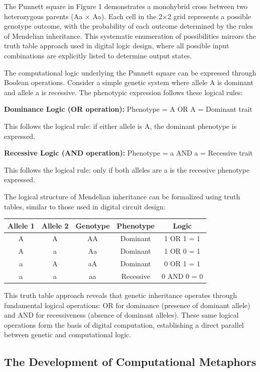 \documentclass[11pt]{article}
\begin{document}
The Punnett square in Figure 1 demonstrates a monohybrid cross between two heterozygous parents (Aa × Aa). Each cell in the 2×2 grid represents a possible genotype outcome, with the probability of each outcome determined by the rules of Mendelian inheritance. This systematic enumeration of possibilities mirrors the truth table approach used in digital logic design, where all possible input combinations are explicitly listed to determine output states.

The computational logic underlying the Punnett square can be expressed through Boolean operations. Consider a simple genetic system where allele A is dominant and allele a is recessive. The phenotypic expression follows these logical rules:

\textbf{Dominance Logic (OR operation):} Phenotype = A OR A = Dominant trait

This follows the logical rule: if either allele is A, the dominant phenotype is expressed.

\textbf{Recessive Logic (AND operation):} Phenotype = a AND a = Recessive trait

This follows the logical rule: only if both alleles are a is the recessive phenotype expressed.

The logical structure of Mendelian inheritance can be formalized using truth tables, similar to those used in digital circuit design:

\begin{center}
\begin{tabular}{|c|c|c|c|c|}
\hline
Allele 1 & Allele 2 & Genotype & Phenotype & Logic \\
\hline
A & A & AA & Dominant & 1 OR 1 = 1 \\
A & a & Aa & Dominant & 1 OR 0 = 1 \\
a & A & aA & Dominant & 0 OR 1 = 1 \\
a & a & aa & Recessive & 0 AND 0 = 0 \\
\hline
\end{tabular}
\end{center}

This truth table approach reveals that genetic inheritance operates through fundamental logical operations: OR for dominance (presence of dominant allele) and AND for recessiveness (absence of dominant alleles). These same logical operations form the basis of digital computation, establishing a direct parallel between genetic and computational logic.

\subsection{The Development of Computational Metaphors}
\end{document}
